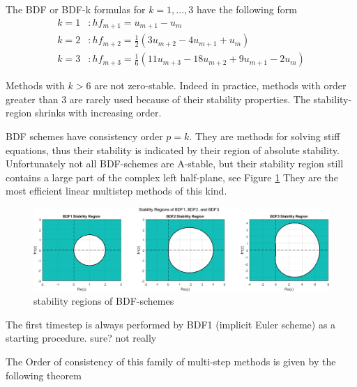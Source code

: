 	The BDF or BDF-k formulas for $k=1,...,3$ have the following form %
	\begin{align*}
		k = 1 &: h f_{m+1} = u_{m+1} - u_m \\
		k = 2 &: h f_{m+2} = \frac{1}{2} (3 u_{m+2} - 4 u_{m+1} + u_m) \\
		k = 3 &: h f_{m+3} = \frac{1}{6} (11 u_{m+3} - 18 u_{m+2} + 9 u_{m+1} - 2 u_m) %
	\end{align*}
	
	Methods with $k > 6$ are not zero-stable. Indeed in practice, methods with order greater than 3 are rarely used because of their stability properties. The stability-region shrinks with increasing order.
	
	BDF schemes have consistency order $p = k$. They are methods for solving stiff equations, thus their stability is indicated by their region of absolute stability. Unfortunately not all BDF-schemes are A-stable, but their stability region still contains a large part of the complex left half-plane, see Figure \ref{fig:screenshot020} They are the most efficient linear multistep methods of this kind.
	
	\begin{figure}[H]
		\centering
		\includegraphics[width=1\linewidth]{pictures/bdf_stability_regions.png}
		\caption{stability regions of BDF-schemes}
		\label{fig:screenshot020}
	\end{figure}
	
	The first timestep is always performed by BDF1 (implicit Euler scheme) as a starting procedure. sure? not really
	
	The Order of consistency of this family of multi-step methods is given by the following theorem
	
